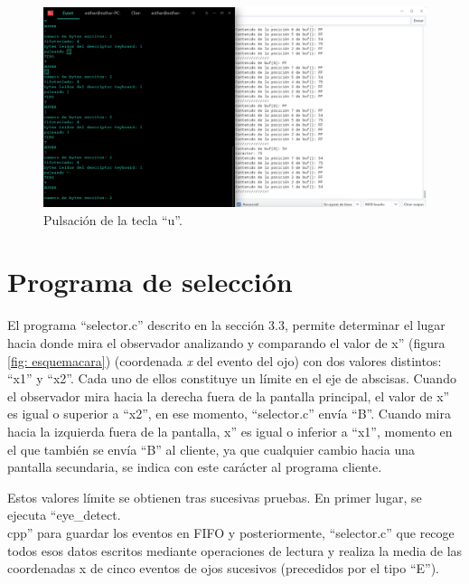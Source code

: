     \begin{figure}
    \centering
    \includegraphics[scale = 0.45]{capitulo_04/figuras_dir/teclau.jpg}
    \caption{Pulsación de la tecla ``u''.}
    \end{figure}

\clearpage
\section{Programa de selección} \label{s4_5}

El programa ``selector.c'' descrito en la sección 3.3, permite determinar el lugar hacia donde mira el observador analizando y comparando el valor de  x'' (figura \ref{fig: esquemacara}) (coordenada {\itshape x} del evento del ojo) con dos valores distintos: ``x1'' y ``x2''. Cada uno de ellos constituye un límite en el eje de abscisas. Cuando el observador mira hacia la derecha fuera de la pantalla principal, el valor de x'' es igual o superior a ``x2'', en ese momento, ``selector.c'' envía ``B''. Cuando mira hacia la izquierda fuera de la pantalla, x'' es igual o inferior a ``x1'', momento en el que también se envía ``B'' al cliente, ya que cualquier cambio hacia una pantalla secundaria, se indica con este carácter al programa cliente. 

Estos valores límite se obtienen tras sucesivas pruebas. En primer lugar, se ejecuta ``eye\_detect.\\cpp'' para guardar los eventos en FIFO y posteriormente, ``selector.c'' que recoge todos esos datos escritos mediante operaciones de lectura y realiza la media de las coordenadas x de cinco eventos de ojos sucesivos (precedidos por el tipo ``E'').

